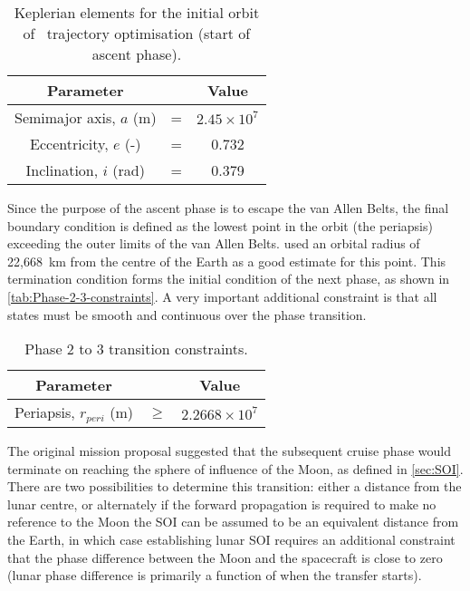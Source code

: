 \begin{table}[h]
\caption{Keplerian elements for the initial orbit of \BW\ trajectory optimisation (start of ascent phase).} \label{tab:Phase-2-constraints}
\centering
\begin{tabular} {ccc}\toprule
Parameter & & Value\\\midrule
Semimajor axis, $a$ (m) &=& $2.45\times 10^7$\\
Eccentricity, $e$ (-) &=& 0.732\\
Inclination, $i$ (rad) &=& 0.379\\\bottomrule
\end{tabular}
\end{table}

Since the purpose of the ascent phase is to escape the van Allen Belts, the final boundary condition is defined as the lowest point in the orbit (the periapsis) exceeding the outer limits of the van Allen Belts. \textcite{Letterio_thesis} used an orbital radius of 22,668~km from the centre of the Earth as a good estimate for this point. This termination condition forms the initial condition of the next phase, as shown in \autoref{tab:Phase-2-3-constraints}. A very important additional constraint is that all states must be smooth and continuous over the phase transition.

\begin{table}[h]
\caption{Phase 2 to 3 transition constraints.} \label{tab:Phase-2-3-constraints}
\centering
\begin{tabular} {ccc}\toprule
Parameter & & Value\\\midrule
Periapsis, $r_{peri}$ (m) &$\ge$& $2.2668\times 10^7$\\\bottomrule
\end{tabular}
\end{table}

The original mission proposal \parencite{Roeser2006} suggested that the subsequent cruise phase would terminate on reaching the sphere of influence of the Moon, as defined in \autoref{sec:SOI}. There are two possibilities to determine this transition: either a distance from the lunar centre, or alternately if the forward propagation is required to make no reference to the Moon the SOI can be assumed to be an equivalent distance from the Earth, in which case establishing lunar SOI requires an additional constraint that the phase difference between the Moon and the spacecraft is close to zero (lunar phase difference is primarily a function of when the transfer starts). 

